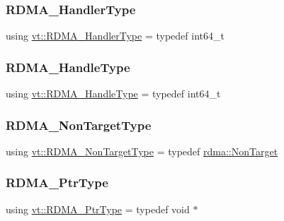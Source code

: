 \subsubsection{\texorpdfstring{R\+D\+M\+A\+\_\+\+Handler\+Type}{RDMA\_HandlerType}}
{\footnotesize\ttfamily using \hyperlink{namespacevt_a9530efb893c0f3846e8ac5f0507e0f49}{vt\+::\+R\+D\+M\+A\+\_\+\+Handler\+Type} = typedef int64\+\_\+t}

\mbox{\label{namespacevt_a10442579ec4e7ebef223818e64bcf908}} 
\subsubsection{\texorpdfstring{R\+D\+M\+A\+\_\+\+Handle\+Type}{RDMA\_HandleType}}
{\footnotesize\ttfamily using \hyperlink{namespacevt_a10442579ec4e7ebef223818e64bcf908}{vt\+::\+R\+D\+M\+A\+\_\+\+Handle\+Type} = typedef int64\+\_\+t}

\mbox{\label{namespacevt_ae5bd2866e5ee83f4d6a53e8730cd3202}} 
\subsubsection{\texorpdfstring{R\+D\+M\+A\+\_\+\+Non\+Target\+Type}{RDMA\_NonTargetType}}
{\footnotesize\ttfamily using \hyperlink{namespacevt_ae5bd2866e5ee83f4d6a53e8730cd3202}{vt\+::\+R\+D\+M\+A\+\_\+\+Non\+Target\+Type} = typedef \hyperlink{structvt_1_1rdma_1_1_non_target}{rdma\+::\+Non\+Target}}

\mbox{\label{namespacevt_a9e2c953286c7616f7c218e9951790776}} 
\subsubsection{\texorpdfstring{R\+D\+M\+A\+\_\+\+Ptr\+Type}{RDMA\_PtrType}}
{\footnotesize\ttfamily using \hyperlink{namespacevt_a9e2c953286c7616f7c218e9951790776}{vt\+::\+R\+D\+M\+A\+\_\+\+Ptr\+Type} = typedef void $\ast$}

